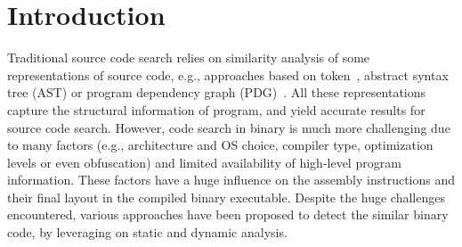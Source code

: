 \section{Introduction}

Traditional source code search relies on similarity analysis of some representations of source code, e.g., approaches based on token~\cite{DBLP:journals/tse/KamiyaKI02}, abstract syntax tree (AST) \cite{DBLP:conf/icse/JiangMSG07} or program dependency graph (PDG)~\cite{DBLP:conf/icse/GabelJS08}. All these representations capture the structural information of program, and yield accurate results for source code search. However, code search in binary is much more challenging due to many factors (e.g., architecture and OS choice, compiler type, optimization levels or even obfuscation) and limited availability of high-level program information. These factors have a huge influence on the assembly instructions and their final layout in the compiled binary executable. Despite the huge challenges encountered, various approaches have been proposed to detect the similar binary code, by leveraging on static and dynamic analysis. 
 
